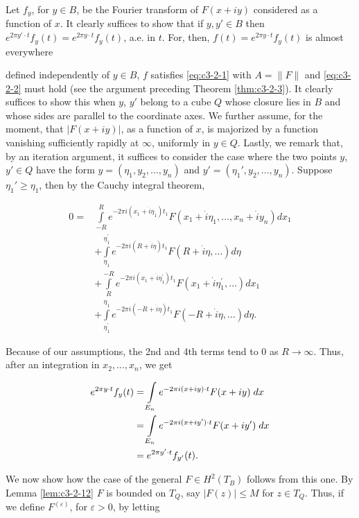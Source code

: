 Let $f_y$, for $y \in B$, be the Fourier transform of $F(x + iy)$ considered as a function of $x$. It clearly suffices to show that if $y, y' \in B$ then $e^{2\pi y' \cdot t} f_y(t) = e^{2\pi y \cdot t} f_y(t)$, a.e. in $t$. For, then, $f(t) = e^{2\pi y \cdot t} f_y(t)$ is almost everywhere

defined independently of $y \in B$, $f$ satisfies \eqref{eq:c3-2-1} with $A = \| F\|$ and \eqref{eq:c3-2-2} must hold (see the argument preceding Theorem \ref{thm:c3-2-3}). It clearly suffices to show this when $y$, $y'$ belong to a cube $Q$ whose closure lies in $B$ and whose sides are parallel to the coordinate axes. We further assume, for the moment, that $|F(x + iy)|$, as a function of $x$, is majorized by a function vanishing sufficiently rapidly at $\infty$, uniformly in $y \in Q$. Lastly, we remark that, by an iteration argument, it suffices to consider the case where the two points $y$, $y' \in Q$ have the form $y = (\eta_1, y_2, \ldots, y_n)$ and $y' = (\eta_1', y_2, \ldots, y_n)$. Suppose $\eta_1' \geq \eta_1$, then by the Cauchy integral theorem,

\[
\begin{aligned}0=&\int\limits_{-R}^{R}e^{-2\pi i(x_{1}+\dot{i}\eta_{1})t_{1}}F(x_{1}+\dot{i}\eta_{1},\ldots,x_{n}+\dot{i}y_{n})dx_{1}\\&+\int\limits_{\eta_{1}}^{\eta_{1}^{\prime}}e^{-2\pi i(R+\dot{i}\eta)t_{1}}F(R+\dot{i}\eta,\ldots)d\eta\\&+\int\limits_{R}^{-R}e^{-2\pi i(x_{1}+\dot{i}\eta_{1}^{\prime})t_{1}}F(x_{1}+\dot{i}\eta_{1}^{\prime},\ldots)dx_{1}\\&+\int\limits_{\eta_{1}^{\prime}}^{\eta_{1}}e^{-2\pi i(-\dot{R}+\dot{i}\eta)t_{1}}F(-R+\dot{i}\eta,\ldots)d\eta.\end{aligned}
\]

Because of our assumptions, the 2nd and 4th terms tend to 0 as $R \to \infty$. Thus, after an integration in $x_2, \ldots, x_n$, we get

\[
\begin{aligned}{e^{2\pi y\cdot t}f_{y}(t)}&{{}=\intop_{E_{n}}e^{-2\pi i(x+i y)\cdot t}F(x+i y)\;d x}\\ {}&{{}=\intop_{E_{n}}e^{-2\pi i(x+i y^{\prime})\cdot t}F(x+i y^{\prime})\;d x}\\ {}&{{}=e^{2\pi y^{\prime}\cdot t}f_{y^{\prime}}(t).}\\ \end{aligned}
\]

We now show how the case of the general $F\in H^2(T_B)$ follows from this one. By Lemma \ref{lem:c3-2-12} $F$ is bounded on $T_Q$, say $|F(z)|\leq M$ for $z\in T_Q$. Thus, if we define $F^{(\varepsilon)}$, for $\varepsilon>0$, by letting

